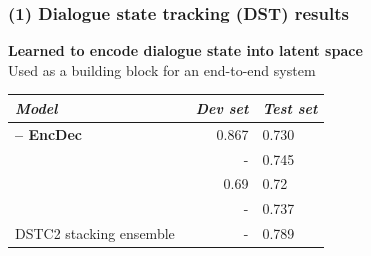 \documentclass[10pt, compress,british,xcolor={svgnames,dvipsnames,x11names},trans]{beamer}
\begin{document}
\begin{frame}\frametitle{(1) Dialogue state tracking (DST) results}
\begin{center}


    {\bf Learned to encode dialogue state into latent space} \\
        Used as a building block for an end-to-end system
    \vfill
\begin{tabular}{l@{\quad}rll}
\hline
\multicolumn{1}{l}{\rule{0pt}{12pt}
                   {\it Model}}&\multicolumn{1}{l}{\it Dev set}&\multicolumn{2}{l}{\it Test set}\\[2pt]
\hline\rule{0pt}{12pt}
    {\bf \citet{platek2016recurrent} -- EncDec} &   0.867 & 0.730 \\
\hline
    \citet{vodolan_hybrid_2015} & - & 0.745 \\
    \citet{zilka_incremental_2015} & 0.69 & 0.72 \\
    \citet{henderson2013deep} & - & 0.737 \\
\hline
    DSTC2 stacking ensemble~\cite{henderson2014second} & - & 0.789 \\
\hline
\end{tabular}
\end{center}
\end{frame}
\end{document}
